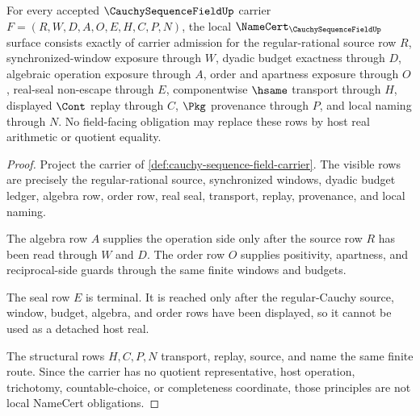 \begin{theorem}
\label{thm:cauchy-sequence-field-namecert-obligations}
For every accepted $\CauchySequenceFieldUp$ carrier $F=(R,W,D,A,O,E,H,C,P,N)$, the local $\NameCert_{\CauchySequenceFieldUp}$ surface consists exactly of carrier admission for the regular-rational source row $R$, synchronized-window exposure through $W$, dyadic budget exactness through $D$, algebraic operation exposure through $A$, order and apartness exposure through $O$, real-seal non-escape through $E$, componentwise $\hsame$ transport through $H$, displayed $\Cont$ replay through $C$, $\Pkg$ provenance through $P$, and local naming through $N$. No field-facing obligation may replace these rows by host real arithmetic or quotient equality.
\end{theorem}
\begin{proof}
Project the carrier of \autoref{def:cauchy-sequence-field-carrier}. The visible rows are precisely the regular-rational source, synchronized windows, dyadic budget ledger, algebra row, order row, real seal, transport, replay, provenance, and local naming.

The algebra row $A$ supplies the operation side only after the source row $R$ has been read through $W$ and $D$. The order row $O$ supplies positivity, apartness, and reciprocal-side guards through the same finite windows and budgets.

The seal row $E$ is terminal. It is reached only after the regular-Cauchy source, window, budget, algebra, and order rows have been displayed, so it cannot be used as a detached host real.

The structural rows $H,C,P,N$ transport, replay, source, and name the same finite route. Since the carrier has no quotient representative, host operation, trichotomy, countable-choice, or completeness coordinate, those principles are not local NameCert obligations.
\end{proof}

